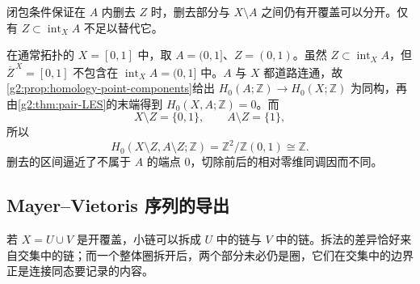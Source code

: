 闭包条件保证在 \(A\) 内删去 \(Z\) 时，删去部分与 \(X\setminus A\) 之间仍有开覆盖可以分开。仅有 \(Z\subset\operatorname{int}_X A\) 不足以替代它。

\begin{example}\label{g2:exm:excision-closure-failure}
	在通常拓扑的 \(X=[0,1]\) 中，取 \(A=(0,1]\)、\(Z=(0,1)\)。虽然 \(Z\subset\operatorname{int}_X A\)，但 \(\overline Z^{\,X}=[0,1]\) 不包含在 \(\operatorname{int}_X A=(0,1]\) 中。\(A\) 与 \(X\) 都道路连通，故\cref{g2:prop:homology-point-components}给出 \(H_0(A;\mathbb Z)\to H_0(X;\mathbb Z)\) 为同构，再由\cref{g2:thm:pair-LES}的末端得到 \(H_0(X,A;\mathbb Z)=0\)。而
	\[
		X\setminus Z=\{0,1\},\qquad A\setminus Z=\{1\},
	\]
	所以
	\[
		H_0(X\setminus Z,A\setminus Z;\mathbb Z)
		=\mathbb Z^2/\mathbb Z(0,1)\cong\mathbb Z.
	\]
	删去的区间逼近了不属于 \(A\) 的端点 \(0\)，切除前后的相对零维同调因而不同。
\end{example}

\subsection{Mayer–Vietoris 序列的导出}
\label{g2:subsec:0203:05}

若 \(X=U\cup V\) 是开覆盖，小链可以拆成 \(U\) 中的链与 \(V\) 中的链。拆法的差异恰好来自交集中的链；而一个整体圈拆开后，两个部分未必仍是圈，它们在交集中的边界正是连接同态要记录的内容。

